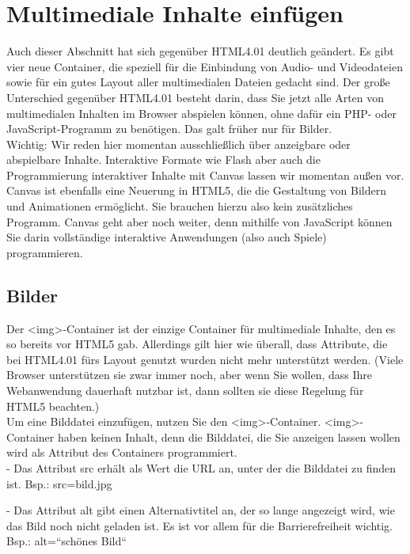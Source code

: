\section{Multimediale Inhalte einfügen}

Auch dieser Abschnitt hat sich gegenüber HTML4.01 deutlich geändert. Es gibt vier neue Container, die speziell für die Einbindung von Audio- und Videodateien sowie für ein gutes Layout aller multimedialen Dateien gedacht sind. Der große Unterschied gegenüber HTML4.01 besteht darin, dass Sie jetzt alle Arten von multimedialen Inhalten im Browser abspielen können, ohne dafür ein PHP- oder JavaScript-Programm zu benötigen. Das galt früher nur für Bilder.\\

Wichtig: Wir reden hier momentan ausschließlich über anzeigbare oder abspielbare Inhalte. Interaktive Formate wie Flash aber auch die Programmierung interaktiver Inhalte mit Canvas lassen wir momentan außen vor. Canvas ist ebenfalls eine Neuerung in HTML5, die die Gestaltung von Bildern und Animationen ermöglicht. Sie brauchen hierzu also kein zusätzliches Programm. Canvas geht aber noch weiter, denn mithilfe von JavaScript können Sie darin vollständige interaktive Anwendungen (also auch Spiele) programmieren.

\subsection{Bilder}

Der <img>-Container ist der einzige Container für multimediale Inhalte, den es so bereits vor HTML5 gab. Allerdings gilt hier wie überall, dass Attribute, die bei HTML4.01 fürs Layout genutzt wurden nicht mehr unterstützt werden. (Viele Browser unterstützen sie zwar immer noch, aber wenn Sie wollen, dass Ihre Webanwendung dauerhaft nutzbar ist, dann sollten sie diese Regelung für HTML5 beachten.)\\

Um eine Bilddatei einzufügen, nutzen Sie den <img>-Container. <img>-Container haben keinen Inhalt, denn die Bilddatei, die Sie anzeigen lassen wollen wird als Attribut des Containers programmiert.\\

-	Das Attribut src erhält als Wert die URL an, unter der die Bilddatei zu finden ist.
Bsp.: src=bild.jpg

-	Das Attribut alt gibt einen Alternativtitel an, der so lange angezeigt wird, wie das Bild noch nicht geladen ist. Es ist vor allem für die Barrierefreiheit wichtig.
Bsp.: alt=“schönes Bild“

